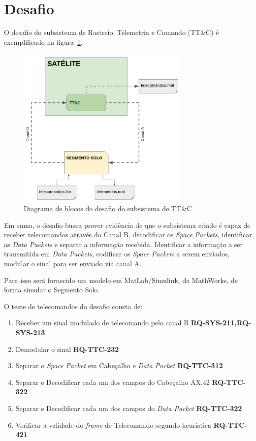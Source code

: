 \section{Desafio}

O desafio do subsistema de Rastreio, Telemetria e Comando (TT\&C) é exemplificado na figura~\ref{fig:challenge}.

\begin{figure}[H]
    \centering
    \includegraphics[width=0.75\textwidth]{figures/ttec.png}
    \caption{Diagrama de blocos do desafio do subsistema de TT\&C}
    \label{fig:challenge}
\end{figure}

Em suma, o desafio busca prover evidência de que o subsistema citado é capaz de receber telecomandos através do Canal B, decodificar os \textit{Space Packets}, identificar os \textit{Data Packets} e separar a informação recebida.
Identificar a informação a ser transmitida em \textit{Data Packets}, codificar os \textit{Space Packets} a serem enviados, modular o sinal para ser enviado via canal A.

Para isso será fornecido um modelo em MatLab/Simulink, da MathWorks, de forma simular o Segmento Solo.

O teste de telecomandos do desafio consta de:

\begin{enumerate}[label=(\roman*)]
    \item Receber um sinal modulado de telecomando pelo canal B \textbf{RQ-SYS-211,RQ-SYS-213}
    \item Demodular o sinal \textbf{RQ-TTC-232}
    \item Separar o \textit{Space Packet} em Cabeçalho e \textit{Data Packet} \textbf{RQ-TTC-312}
    \item Separar e Decodificar  cada um dos campos do Cabeçalho AX.42 \textbf{RQ-TTC-322}
    \item Separar e Decodificar cada um dos campos do \textit{Data Packet} \textbf{RQ-TTC-322}
    \item Verificar a validade do \textit{frame} de Telecomando segundo heurística \textbf{RQ-TTC-421}
\end{enumerate}

